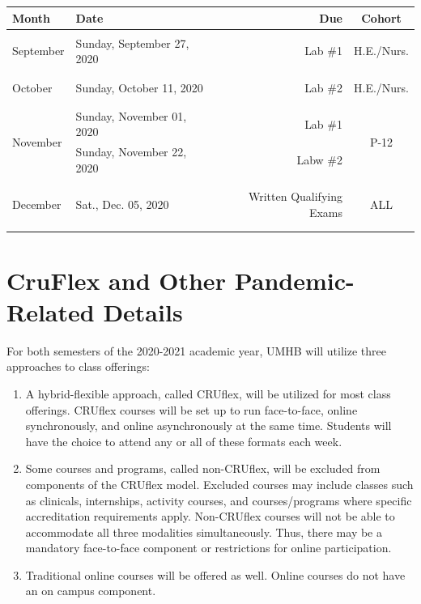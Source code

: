 \documentclass[
]{article}
\begin{document}
\begin{tabularx}{\linewidth}{p{3cm}Xrc}
\hline
\textbf{Month} & \textbf{Date} & \textbf{Due} & \textbf{Cohort} \\
\hline
&  &  & \\
\multirow{1}{*}{September} & Sunday, September 27, 2020 & Lab \#1 & H.E./Nurs. \\
&  &  & \\
\arrayrulecolor{gray}\hline

&  &  & \\
\multirow{1}{*}{October} & Sunday, October 11, 2020 & Lab \#2 & H.E./Nurs. \\
&  &  & \\
\arrayrulecolor{gray}\hline

&  &  & \\
\multirow{2}{*}{November} & Sunday, November 01, 2020 & Lab \#1 & \multirow{2}{*}{P-12} \\
& Sunday, November 22, 2020 & Labw \#2 \\
&  &  & \\
\arrayrulecolor{gray}\hline


&  &  & \\
\multirow{1}{*}{December} & Sat., Dec. 05, 2020 & Written Qualifying Exams & ALL\\
&  &  & \\
\arrayrulecolor{gray}\hline

\end{tabularx}

\newpage
\section{CruFlex and Other Pandemic-Related Details}

For both semesters of the 2020-2021 academic year, UMHB will utilize
three approaches to class offerings:

\begin{enumerate}
\item A hybrid-flexible approach, called CRUflex, will be utilized for most class offerings. CRUflex courses will be set up to run face-to-face, online synchronously, and online asynchronously at the same time. Students will have the choice to attend any or all of these formats each week.
\item Some courses and programs, called non-CRUflex, will be excluded from components of the CRUflex model. Excluded courses may include classes such as clinicals, internships, activity courses, and courses/programs where specific accreditation requirements apply. Non-CRUflex courses will not be able to accommodate all three modalities simultaneously. Thus, there may be a mandatory face-to-face component or restrictions for online participation.
\item Traditional online courses will be offered as well. Online courses do not have an on campus component.
\end{enumerate}
\end{document}
